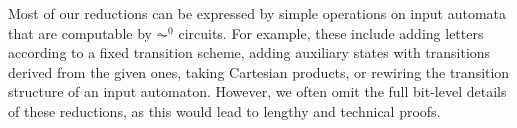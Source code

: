 \begin{remark} \label{prelim:rem:reductionsAC0} 
	Most of our reductions can be expressed by simple operations on input automata that are computable by $\AC^0$ circuits. For example, these include adding letters according to a fixed transition scheme, adding auxiliary states with transitions derived from the given ones, taking Cartesian products, or rewiring the transition structure of an input automaton.
	However, we often omit the full bit-level details of these reductions, as this would lead to lengthy and technical proofs.
\end{remark}